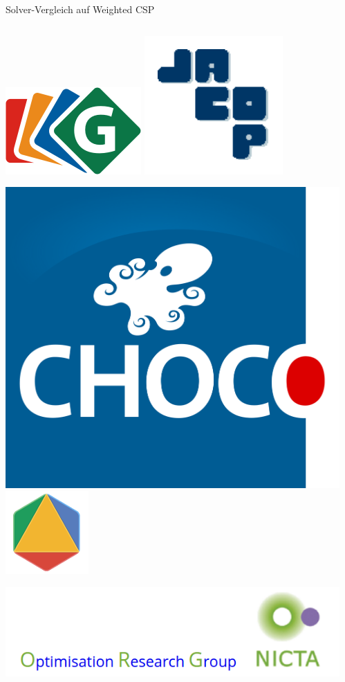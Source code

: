 \begin{frame}[fragile]{Solver-Vergleich auf Weighted CSP}
\vspace*{2ex}
\begin{columns}[onlytextwidth]
    \begin{column}{.45\textwidth}
    \centering {}

    \vspace*{1ex}

    \includegraphics[width=.2\columnwidth]{img/gecode.png}    
    \includegraphics[width=.2\columnwidth]{img/JACOP.png}
    
    \includegraphics[width=.2\columnwidth]{img/choco.png}
    \includegraphics[width=.2\columnwidth]{img/orLogo.png}

    \includegraphics[width=.5\columnwidth]{img/nictaorg.png}
	
    \end{column}
    \begin{column}{.45\textwidth}
    \centering {}

    \vspace*{1ex}
    

\end{column}
\end{columns}
\end{frame}
